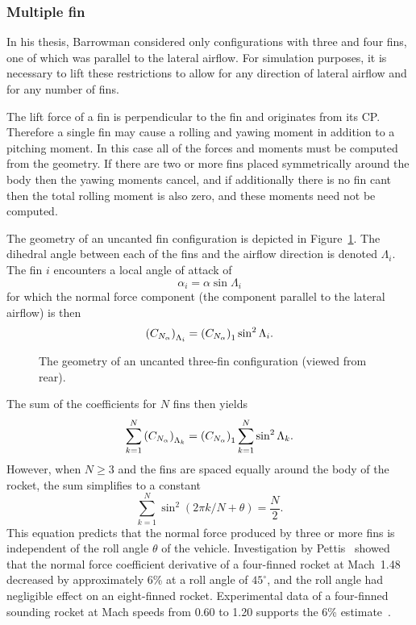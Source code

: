 \subsubsection{Multiple fin \CNa}
\label{update-roll-angle}

In his thesis, Barrowman considered only configurations with three and
four fins, one of which was parallel to the lateral airflow.  For
simulation purposes, it is necessary to lift these restrictions to
allow for any direction of lateral airflow and for any number of
fins.

The lift force of a fin is perpendicular to the fin and originates
from its CP.  Therefore a single fin may cause a rolling and yawing
moment in addition to a pitching moment.  In this case all of the
forces and moments must be computed from the geometry.  If there are
two or more fins placed symmetrically around the body then the yawing
moments cancel, and if additionally there is no fin cant then the
total rolling moment is also zero, and these moments need not be
computed.

The geometry of an uncanted fin configuration is depicted in
Figure~\ref{fig-dihedral-angle}.  The dihedral angle between each of
the fins and the airflow direction is denoted $\Lambda_i$.  The fin
$i$ encounters a local angle of attack of
%
\begin{equation}
\alpha_i = \alpha \sin\Lambda_i
\end{equation}
%
for which the normal force component (the component parallel to the
lateral airflow) is then
%
\begin{equation}
\del{\CNa}_{\Lambda_i} = \del{\CNa}_1 \sin^2 \Lambda_i.
\end{equation}


\begin{figure}
\centering
{}
\caption{The geometry of an uncanted three-fin configuration (viewed
  from rear).}
\label{fig-dihedral-angle}
\end{figure}


The sum of the coefficients for $N$ fins then yields
%
\begin{equation}
\sum_{k=1}^N \del{\CNa}_{\Lambda_k} =
    \del{\CNa}_1 \sum_{k=1}^N \sin^2\Lambda_k.
\label{N-fin-equation}
\end{equation}
%
However, when $N\geq 3$ and the fins are spaced equally around the
body of the rocket, the sum simplifies to a constant
%
\begin{equation}
\sum_{k=1}^N \sin^2 (2\pi k/N + \theta) = \frac{N}{2}.
\label{N-fin-simplification}
\end{equation}
%
This equation predicts that the normal force produced by three or more
fins is independent of the roll angle $\theta$ of the vehicle.
Investigation by Pettis~\cite{pettis} showed that the normal force
coefficient derivative of a four-finned rocket at Mach~1.48 decreased
by approximately 6\% at a roll angle of $45^\circ$, and the roll angle
had negligible effect on an eight-finned rocket.  Experimental data of
a four-finned sounding rocket at Mach speeds from 0.60 to 1.20
supports the 6\% estimate~\cite{experimental-transonic}.  

